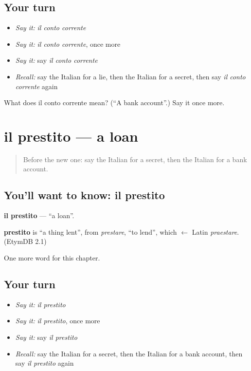 \subsection*{Your turn}
\begin{itemize}
\raggedright
  \item \emph{Say it:} \emph{il conto corrente}
  \item \emph{Say it:} \emph{il conto corrente}, once more
  \item \emph{Say it:} say \emph{il conto corrente}
  \item \emph{Recall:} say the Italian for a lie, then the Italian for a secret, then say \emph{il conto corrente} again
\end{itemize}

\begin{tcolorbox}[breakable,colback=teal!4,colframe=teal!35!black,title={Before you move on}]
What does il conto corrente mean? (\textquotedblleft{}A bank account\textquotedblright{}.) Say it once more.
\end{tcolorbox}
\section[il prestito]{il prestito — a loan}

\label{lesson:IT-C253-prestito}



\begin{quote}
Before the new one: say the Italian for a secret, then the Italian for a bank account.
\end{quote}

\subsection*{You'll want to know: il prestito}
\textbf{il prestito} — \textquotedblleft{}a loan\textquotedblright{}.

\begin{cousinweb}
\textbf{prestito} is \textquotedblleft{}a thing lent\textquotedblright{}, from \emph{prestare}, \textquotedblleft{}to lend\textquotedblright{}, which $\leftarrow$ Latin \emph{praestare}. (EtymDB 2.1)
\end{cousinweb}

\begin{grammarlens}[title={What you've built}]
One more word for this chapter.
\end{grammarlens}

\subsection*{Your turn}
\begin{itemize}
\raggedright
  \item \emph{Say it:} \emph{il prestito}
  \item \emph{Say it:} \emph{il prestito}, once more
  \item \emph{Say it:} say \emph{il prestito}
  \item \emph{Recall:} say the Italian for a secret, then the Italian for a bank account, then say \emph{il prestito} again
\end{itemize}

